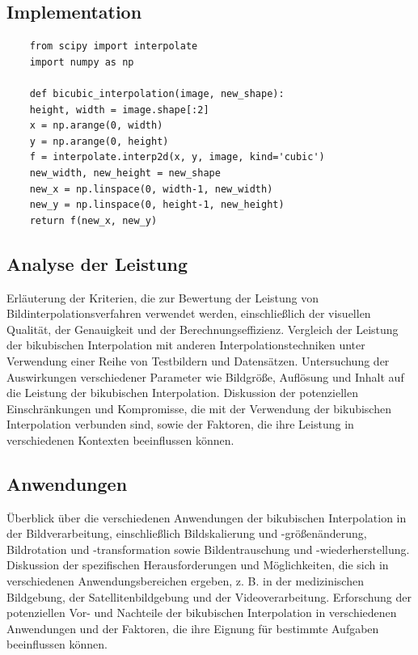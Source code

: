     \subsection{Implementation}
    \begin{lstlisting}
    from scipy import interpolate
    import numpy as np

    def bicubic_interpolation(image, new_shape):
    height, width = image.shape[:2]
    x = np.arange(0, width)
    y = np.arange(0, height)
    f = interpolate.interp2d(x, y, image, kind='cubic')
    new_width, new_height = new_shape
    new_x = np.linspace(0, width-1, new_width)
    new_y = np.linspace(0, height-1, new_height)
    return f(new_x, new_y)
    \end{lstlisting}
    \subsection{Analyse der Leistung}

    Erläuterung der Kriterien, die zur Bewertung der Leistung von Bildinterpolationsverfahren verwendet werden, einschließlich der visuellen Qualität, der Genauigkeit und der Berechnungseffizienz.
    Vergleich der Leistung der bikubischen Interpolation mit anderen Interpolationstechniken unter Verwendung einer Reihe von Testbildern und Datensätzen.
    Untersuchung der Auswirkungen verschiedener Parameter wie Bildgröße, Auflösung und Inhalt auf die Leistung der bikubischen Interpolation.
    Diskussion der potenziellen Einschränkungen und Kompromisse, die mit der Verwendung der bikubischen Interpolation verbunden sind, sowie der Faktoren, die ihre Leistung in verschiedenen Kontexten beeinflussen können.

    \subsection{Anwendungen}

    Überblick über die verschiedenen Anwendungen der bikubischen Interpolation in der Bildverarbeitung, einschließlich Bildskalierung und -größenänderung, Bildrotation und -transformation sowie Bildentrauschung und -wiederherstellung.
    Diskussion der spezifischen Herausforderungen und Möglichkeiten, die sich in verschiedenen Anwendungsbereichen ergeben, z. B. in der medizinischen Bildgebung, der Satellitenbildgebung und der Videoverarbeitung.
    Erforschung der potenziellen Vor- und Nachteile der bikubischen Interpolation in verschiedenen Anwendungen und der Faktoren, die ihre Eignung für bestimmte Aufgaben beeinflussen können.

